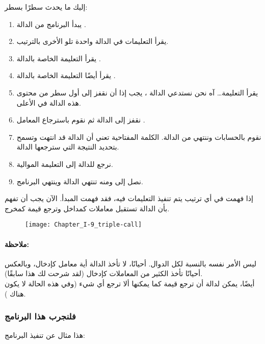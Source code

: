 إليك ما يحدث سطرًا بسطر:

\begin{enumerate}
	\item يبدأ البرنامج من الدالة
	.
	\item يقرأ التعليمات في الدالة واحدة تلو الأخرى بالترتيب.
	\item يقرأ التعليمة الخاصة بالدالة
	.
	\item يقرأ أيضًا التعليمة الخاصة بالدالة 
	.
	\item يقرأ التعليمة\dots
	آه نحن نستدعي الدالة 
	،
	يجب إذا أن نقفز إلى أول سطر من محتوى هذه الدالة في الأعلى.
	\item نقفز إلى الدالة
	 ثم نقوم باسترجاع المعامل
	.
	\item نقوم بالحسابات وننتهي من الدالة. الكلمة المفتاحية 
	تعني أن الدالة قد انتهت وتسمح بتحديد النتيجة التي سترجعها الدالة.
	\item نرجع للدالة 
	إلى التعليمة الموالية.
	\item نصل إلى 
 ومنه تنتهي الدالة
 وينتهي البرنامج.
\end{enumerate}

إذا فهمت في أي ترتيب يتم تنفيذ التعليمات فيه، فقد فهمت المبدأ. الآن يجب أن تفهم بأن الدالة تستقبل معاملات كمداخل وترجع قيمة كمخرج.

\begin{figure}[H]
	\centering
	\texttt{[image: Chapter\_I-9\_triple-call]}
\end{figure}

\paragraph{ملاحظة:}

ليس الأمر نفسه بالنسبة لكل الدوال. أحيانًا، لا تأخذ الدالة أية معامل كإدخال، وبالعكس أحيانًا تأخذ الكثير من المعاملات كإدخال (لقد شرحت لك هذا سابقًا).\\
أيضًا، يمكن لدالة أن ترجع قيمة كما يمكنها ألا ترجع أي شيء (وفي هذه الحالة لا يكون هناك
).

\subsubsection{فلنجرب هذا البرنامج}

هذا مثال عن تنفيذ البرنامج:


